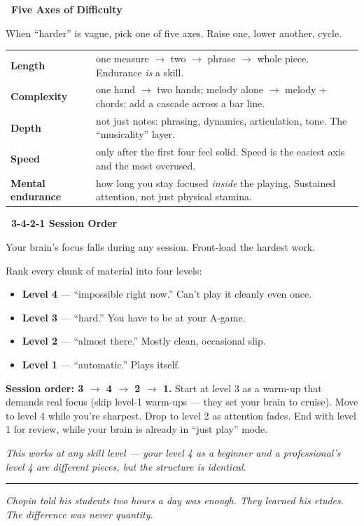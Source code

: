\documentclass[letterpaper]{article}
\newcommand{\sect}[3]{%
  \noindent\begin{minipage}{\linewidth}%
  \colorbox{#1}{\color{white}\textbf{\ #2\ }}\par\vspace{1mm}
  #3
  \end{minipage}\par\vspace{3mm}%
}
\begin{document}
\sect{axesClr}{Five Axes of Difficulty}{%
When ``harder'' is vague, pick one of five axes. Raise one, lower another, cycle.

\vspace{1mm}
\renewcommand{\arraystretch}{1.2}
\setlength{\tabcolsep}{4pt}
\begin{tabular}{@{}p{22mm}p{\dimexpr\linewidth-28mm\relax}@{}}
\textbf{Length} & one measure $\to$ two $\to$ phrase $\to$ whole piece. Endurance \textit{is} a skill. \\
\textbf{Complexity} & one hand $\to$ two hands; melody alone $\to$ melody + chords; add a cascade across a bar line. \\
\textbf{Depth} & not just notes: phrasing, dynamics, articulation, tone. The ``musicality'' layer. \\
\textbf{Speed} & only after the first four feel solid. Speed is the easiest axis and the most overused. \\
\textbf{Mental endurance} & how long you stay focused \textit{inside} the playing. Sustained attention, not just physical stamina. \\
\end{tabular}
}

\sect{orderClr}{3-4-2-1 Session Order}{%
Your brain's focus falls during any session. Front-load the hardest work.

\vspace{1mm}
Rank every chunk of material into four levels:
\begin{itemize}
  \item \textbf{Level 4} --- ``impossible right now.'' Can't play it cleanly even once.
  \item \textbf{Level 3} --- ``hard.'' You have to be at your A-game.
  \item \textbf{Level 2} --- ``almost there.'' Mostly clean, occasional slip.
  \item \textbf{Level 1} --- ``automatic.'' Plays itself.
\end{itemize}

\textbf{Session order: 3 $\to$ 4 $\to$ 2 $\to$ 1.}
Start at level 3 as a warm-up that demands real focus (skip level-1 warm-ups --- they set your brain to cruise). Move to level 4 while you're sharpest. Drop to level 2 as attention fades. End with level 1 for review, while your brain is already in ``just play'' mode.

\textit{This works at any skill level --- your level 4 as a beginner and a professional's level 4 are different pieces, but the structure is identical.}
}

\vspace{2mm}
\hrule
\vspace{1mm}
\small\centering\itshape
Chopin told his students two hours a day was enough. They learned his etudes. The difference was never quantity.
\end{document}
